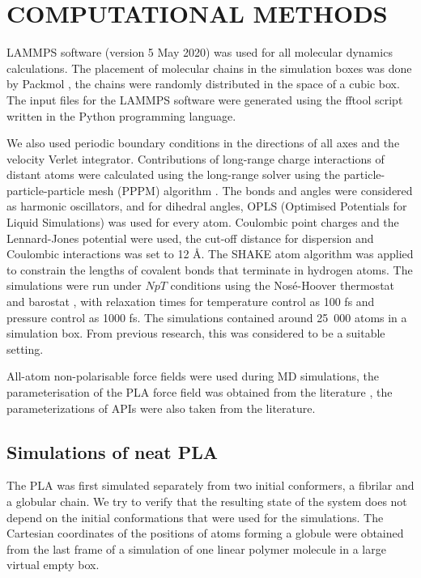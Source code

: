 \newpage
\section{COMPUTATIONAL METHODS}


LAMMPS software \cite{thompson_lammps_2022} (version 5 May 2020) was used for all molecular dynamics calculations. The placement of molecular chains in the simulation boxes was done by Packmol \cite{martinez_p_2009}, the chains were randomly distributed in the space of a cubic box. The input files for the LAMMPS software were generated using the fftool \cite{fftool} script written in the Python programming language.

We also used periodic boundary conditions in the directions of all axes and the velocity Verlet integrator. Contributions of long-range charge interactions of distant atoms were calculated using the long-range solver using the particle-particle-particle mesh (PPPM) algorithm \cite{hockney_computer_2021}. The bonds and angles were considered as harmonic oscillators, and for dihedral angles, OPLS (Optimised Potentials for Liquid Simulations) was used for every atom.  Coulombic point charges and the Lennard-Jones potential were used, the cut-off distance for dispersion and Coulombic interactions was set to 12 \r{A}. The SHAKE atom algorithm \cite{ryckaert_numerical_1977} was applied to constrain the lengths of covalent bonds that terminate in hydrogen atoms. The simulations were run under $NpT$ conditions using the Nosé-Hoover thermostat and barostat \cite{tuckerman_liouville-operator_2006}, with relaxation times for temperature control as 100 fs and pressure control as 1000 fs. The simulations contained around 25~000 atoms in a simulation box. From previous research, this was considered to be a suitable setting. \cite{klajmon_glass_2023}

All-atom non-polarisable force fields were used during MD simulations, the parameterisation of the PLA force field was obtained from the literature \cite{mcaliley_development_2011}, the parameterizations of APIs were also taken from the literature. \cite{cervinka_structure_2021}

\subsection{Simulations of neat PLA}
The PLA was first simulated separately from two initial conformers, a fibrilar and a globular chain. We try to verify that the resulting state of the system does not depend on the initial conformations that were used for the simulations. The Cartesian coordinates of the positions of atoms forming a globule were obtained from the last frame of a simulation of one linear polymer molecule in a large virtual empty box.

